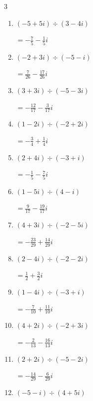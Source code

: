 \begin{multicols}{3}
\begin{enumerate}
        $\displaystyle =-\frac{13}{29}+\frac{18}{29}i$

  \item $\displaystyle (-5+5i)\div(3-4i)$

        $\displaystyle =-\frac{7}{5}-\frac{1}{5}i$

  \item $\displaystyle (-2+3i)\div(-5-i)$

        $\displaystyle =\frac{7}{26}-\frac{17}{26}i$

\columnbreak %

  \item $\displaystyle (3+3i)\div(-5-3i)$

        $\displaystyle =-\frac{12}{17}-\frac{3}{17}i$

  \item $\displaystyle (1-2i)\div(-2+2i)$

        $\displaystyle =-\frac{3}{4}+\frac{1}{4}i$

  \item $\displaystyle (2+4i)\div(-3+i)$

        $\displaystyle =-\frac{1}{5}-\frac{7}{5}i$

  \item $\displaystyle (1-5i)\div(4-i)$

        $\displaystyle =\frac{9}{17}-\frac{19}{17}i$

  \item $\displaystyle (4+3i)\div(-2-5i)$

        $\displaystyle =-\frac{23}{29}+\frac{14}{29}i$

  \item $\displaystyle (2-4i)\div(-2-2i)$

        $\displaystyle =\frac{1}{2}+\frac{3}{2}i$

  \item $\displaystyle (1-4i)\div(-3+i)$

        $\displaystyle =-\frac{7}{10}+\frac{11}{10}i$

  \item $\displaystyle (4+2i)\div(-2+3i)$

        $\displaystyle =-\frac{2}{13}-\frac{16}{13}i$

  \item $\displaystyle (2+2i)\div(-5-2i)$

        $\displaystyle =-\frac{14}{29}-\frac{6}{29}i$

  \item $\displaystyle (-5-i)\div(4+5i)$


\end{enumerate}
\end{multicols}
